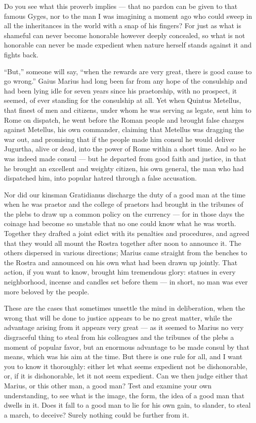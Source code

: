  Do you see what this proverb implies — that no pardon can be given to that famous Gyges, nor to the man I was imagining a moment ago who could sweep in all the inheritances in the world with a snap of his fingers? For just as what is shameful can never become honorable however deeply concealed, so what is not honorable can never be made expedient when nature herself stands against it and fights back.

 ``But,'' someone will say, ``when the rewards are very great, there is good cause to go wrong.'' Gaius Marius had long been far from any hope of the consulship and had been lying idle for seven years since his praetorship, with no prospect, it seemed, of ever standing for the consulship at all. Yet when Quintus Metellus, that finest of men and citizens, under whom he was serving as legate, sent him to Rome on dispatch, he went before the Roman people and brought false charges against Metellus, his own commander, claiming that Metellus was dragging the war out, and promising that if the people made him consul he would deliver Jugurtha, alive or dead, into the power of Rome within a short time. And so he was indeed made consul — but he departed from good faith and justice, in that he brought an excellent and weighty citizen, his own general, the man who had dispatched him, into popular hatred through a false accusation.

 Nor did our kinsman Gratidianus discharge the duty of a good man at the time when he was praetor and the college of praetors had brought in the tribunes of the plebs to draw up a common policy on the currency — for in those days the coinage had become so unstable that no one could know what he was worth. Together they drafted a joint edict with its penalties and procedures, and agreed that they would all mount the Rostra together after noon to announce it. The others dispersed in various directions; Marius came straight from the benches to the Rostra and announced on his own what had been drawn up jointly. That action, if you want to know, brought him tremendous glory: statues in every neighborhood, incense and candles set before them — in short, no man was ever more beloved by the people.

 These are the cases that sometimes unsettle the mind in deliberation, when the wrong that will be done to justice appears to be no great matter, while the advantage arising from it appears very great — as it seemed to Marius no very disgraceful thing to steal from his colleagues and the tribunes of the plebs a moment of popular favor, but an enormous advantage to be made consul by that means, which was his aim at the time. But there is one rule for all, and I want you to know it thoroughly: either let what seems expedient not be dishonorable, or, if it is dishonorable, let it not seem expedient. Can we then judge either that Marius, or this other man, a good man? Test and examine your own understanding, to see what is the image, the form, the idea of a good man that dwells in it. Does it fall to a good man to lie for his own gain, to slander, to steal a march, to deceive? Surely nothing could be further from it.

